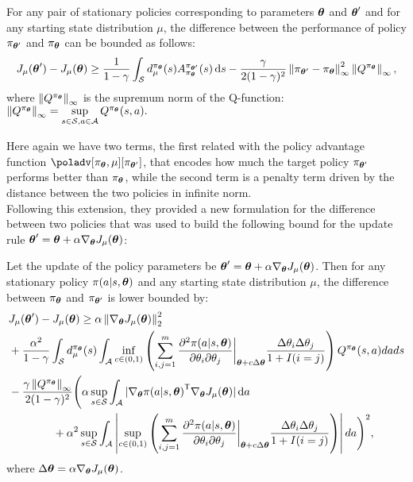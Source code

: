 \begin{theorem}
For any pair of stationary policies corresponding to parameters $\vtheta$ and $\vtheta'$ and for any starting state distribution $\mu$, the difference between the performance of policy $\pi_{\vtheta'}$ and $\pi_{\vtheta}$ can be bounded as follows:
\[
J_\mu(\vtheta') - J_\mu(\vtheta) \geq \frac{1}{1-\gamma}\int_{\sspace} d_\mu^{\pi_{\vtheta}}(s)A_{\pi_{\vtheta}}^{\pi_{\vtheta'}}(s)\de s - \frac{\gamma}{2(1-\gamma)^2}\norm[\infty]{\pi_{\vtheta'} - \pi_{\vtheta}}^2\norm[\infty]{Q^{\pi_{\vtheta}}},
\]
where $\norm[\infty]{Q^{\pi_{\vtheta}}}$ is the supremum norm of the Q-function: $\norm[\infty]{Q^{\pi_{\vtheta}}}=\sup\limits_{\substack{s\in\sspace, a\in\aspace}}Q^{\pi_{\vtheta}}(s,a).$
\end{theorem}
Here again we have two terms, the first related with the policy advantage function $\poladv[\pi_{\vtheta},\mu][\pi_{\vtheta'}]$, that encodes how much the target policy $\pi_{\vtheta'}$ performs better than $\pi_{\vtheta}$, while the second term is a penalty term driven by the distance between the two policies in infinite norm. \\
Following this extension, they provided a new formulation for the difference between two policies that was used to build the following bound for the update rule $\vtheta' = \vtheta + \alpha \gradj$:

\newcommand*{\pol}[1][]{\pi(a|s, \vtheta #1)}

\newcommand*{\secorder}{\left( \sum_{i,j=1}^{m} \frac{\partial^2\pol}{\partial\theta_i\partial\theta_j}\bigg|_{\vtheta + c\Delta\vtheta} \frac{\Delta\theta_i\Delta\theta_j}{1+I(i=j)} \right)}
\begin{theorem}
\label{th:pirotta-bound3}
Let the update of the policy parameters be $\vtheta'=\vtheta+\alpha\nabla_{\vtheta}J_\mu (\vtheta)$. Then for any stationary policy $\pol$ and any starting state distribution $\mu$, the difference between $\pi_{\vtheta}$ and $\pi_{\vtheta'}$ is lower bounded by:
\begin{align*}
&J_\mu(\vtheta') - J_\mu(\vtheta) \geq \alpha\norm[2]{\gradj}^2 \\
&+ \frac{\alpha^2}{1-\gamma}\int_{\sspace} d_\mu^{\pi_{\vtheta}}(s) \int_{\aspace} \inf_{c\in (0,1)} \secorder Q^{\pi_{\vtheta}}(s,a)dads
\\&-
\frac{\gamma\norm[\infty]{Q^{\pi_{\vtheta}}}}{2(1-\gamma)^2}\Bigg( \alpha \sup_{s\in\sspace}\int_{\aspace} |\nabla_{\vtheta}\transpose{\pol}\gradj | \de a
\\&\qquad\qquad + \alpha^2 \sup_{s\in\sspace}\int_{\aspace} \left| \sup_{c \in (0,1)} {\secorder} \right| da \Bigg)^2,
\end{align*}
where $\Delta\vtheta=\alpha\gradj$.
\end{theorem}

